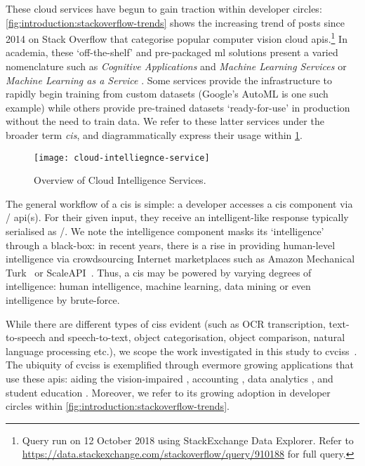 These cloud services have begun to gain traction within developer circles: \cref{fig:introduction:stackoverflow-trends} shows the increasing trend of posts since 2014 on Stack Overflow that categorise popular computer vision cloud \glspl{api}.\footnote{Query run on 12 October 2018 using StackExchange Data Explorer. Refer to \url{https://data.stackexchange.com/stackoverflow/query/910188} for full query.} In academia, these `off-the-shelf' and pre-packaged \gls{ml} solutions present a varied nomenclature such as \textit{Cognitive Applications} and \textit{Machine Learning Services} \citep{Hwang:2017tr} or \textit{Machine Learning as a Service} \citep{Ribeiro:2015dz}. Some services provide the infrastructure to rapidly begin training from custom datasets (Google's AutoML is one such example) while others provide pre-trained datasets `ready-for-use' in production without the need to train data. We refer to these latter services under the broader term \textit{\gls{cis}}, and diagrammatically express their usage within \cref{fig:introduction:cloud-intelliegnce-service}.


\begin{figure}[h!]
\centering
\caption[Overview of cloud intelligence services]{Overview of Cloud Intelligence Services.}
\label{fig:introduction:cloud-intelliegnce-service}
\texttt{[image: cloud-intelliegnce-service]}
\end{figure}

 
The general workflow of a \gls{cis} is  simple: a developer accesses a \gls{cis} component via / \gls{api}(s). For their given input, they receive an intelligent-like response typically serialised as /. We note the intelligence component masks its `intelligence' through a black-box: in recent years, there is a rise in providing human-level intelligence via crowdsourcing Internet marketplaces such as Amazon Mechanical Turk~\citep{MTurk:Home} or ScaleAPI~\citep{ScaleAPI:Home}. Thus, a \gls{cis} may be powered by varying degrees of intelligence: human intelligence, machine learning, data mining or even intelligence by brute-force.

While there are different types of \glspl{cis} evident (such as OCR transcription, text-to-speech and speech-to-text, object categorisation, object comparison, natural language processing etc.), we scope the work investigated in this study to \glspl{cvcis}~\citep{GoogleCloud:Home,Azure:Home,AWS:Home,Pixlab:Home,IBM:Home,Cloudsight:Home,Clarifai:Home,DeepAI:Home,Imagaa:Home,Talkwaler:Home,Kairos:Home,Cognitec:Home,Affectiva:Home}. The ubiquity of \glspl{cvcis} is exemplified through evermore growing applications that use these \glspl{api}: aiding the vision-impaired \citep{Reis:2018cp,daMotaSilveira:2017vp}, accounting  \citep{Marshall:2018uj}, data analytics \citep{Iyengar:2017fb}, and student education \citep{Dibia:2017iy}. Moreover, we refer to its growing adoption in developer circles within \cref{fig:introduction:stackoverflow-trends}.